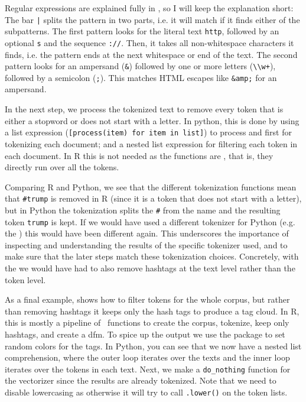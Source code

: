 Regular expressions are explained fully in , so I will keep the explanation short:
The bar \verb#|# splits the pattern in two parts, i.e. it will match if it finds either of the subpatterns.
The first pattern looks for the literal text \verb#http#, followed by an optional \verb#s# and the sequence \verb#://#.
Then, it takes all non-whitespace characters it finds, i.e. the pattern ends at the next whitespace or end of the text.
The second pattern looks for an ampersand (\verb#&#) followed by one or more letters (\verb#\\w+#), followed by a semicolon (\verb#;#).
This matches HTML escapes like \verb#&amp;# for an ampersand.

In the next step, we process the tokenized text to remove every token that is either a stopword or does not start with a letter. 
In python, this is done by using a list expression (\verb#[process(item) for item in list]#) to process and  first for tokenizing each document; and a nested list expression for filtering each token in each document.
In R this is not needed as the  functions are , that is, they directly run over all the tokens.

Comparing R and Python, we see that the different tokenization functions mean that \verb|#trump| is removed in R (since it is a token that does not start with a letter),
but in Python the tokenization splits the \verb|#| from the name and the resulting token \verb|trump| is kept.
If we would have used a different tokenizer for Python (e.g. the ) this would have been different again. 
This underscores the importance of inspecting and understanding the results of the specific tokenizer used,
and to make sure that the later steps match these tokenization choices.
Concretely, with the  we would have had to also remove hashtags at the text level rather than the token level. 


As a final example,  shows how to filter tokens for the whole corpus, but rather than removing hashtags it keeps only the hash tags to produce a tag cloud. 
In R, this is mostly a pipeline of \quanteda\ functions to create the corpus, tokenize, keep only hashtags, and create a dfm.
To spice up the output we use the  package to set random colors for the tags.
In Python, you can see that we now have a nested list comprehension, where the outer loop iterates over the texts and the inner loop iterates over the tokens in each text.
Next, we make a \verb|do_nothing| function for the vectorizer since the results are already tokenized.
Note that we need to disable lowercasing as otherwise it will try to call \verb|.lower()| on the token lists. 



